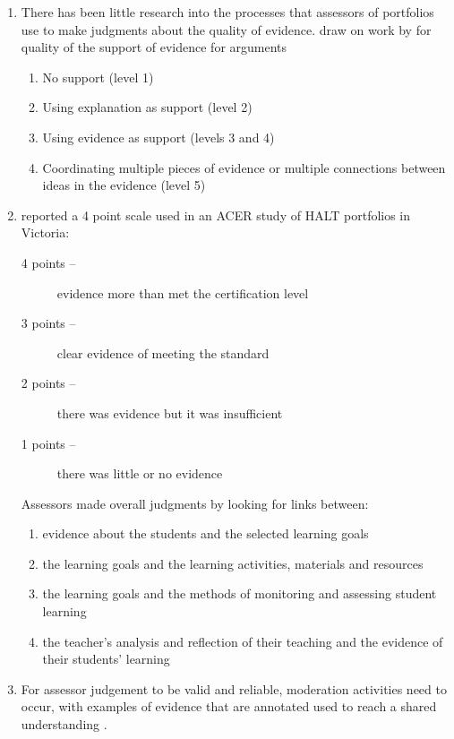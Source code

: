 \begin{enumerate}
    \item There has been little research into the processes that assessors of portfolios use to make judgments about the quality of evidence.  \textcite{vanderschaafExploringRoleAssessment2012} draw on work by  \textcite{clarkPersonallySeededDiscussionsScaffold2007} for quality of the support of evidence for arguments
    \begin{enumerate}
        \item No support (level 1)
        \item Using explanation as support (level 2)
        \item Using evidence as support (levels 3 and 4)
        \item Coordinating multiple pieces of evidence or multiple connections between ideas in the evidence (level 5)
    \end{enumerate}
    \item \textcite{ingvarsonTeachingStandardsPromotion2019} reported a 4 point scale used in an ACER study of HALT portfolios in Victoria:
    \begin{description}
        \item[4 points --] evidence more than met the certification level
        \item[3 points --] clear evidence of meeting the standard
        \item[2 points --] there was evidence but it was insufficient
        \item[1 points --] there was little or no evidence
    \end{description}
    
    Assessors made overall judgments by looking for links between: 
    \begin{enumerate}
        \item evidence about the students and the selected learning goals
        \item the learning goals and the learning activities, materials and resources
        \item the learning goals and the methods of monitoring and assessing student learning
        \item the teacher's analysis and reflection of their teaching and the evidence of their students' learning
    \end{enumerate}
    
    \item For assessor judgement to be valid and reliable, moderation activities need to occur, with examples of evidence that are annotated used to reach a shared understanding \parencite{wyatt-smithStandardsPracticeStandards2017}. 
    

\end{enumerate}
